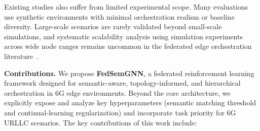 \documentclass[conference]{IEEEtran}
\begin{document}
	\textcolor{revblue}{Existing studies also suffer from limited experimental scope. Many evaluations use synthetic environments with minimal orchestration realism or baseline diversity. Large-scale scenarios are rarely validated beyond small-scale simulations, and systematic scalability analysis using simulation experiments across wide node ranges remains uncommon in the federated edge orchestration literature~\cite{yang2023rlcs, shi2023}.}
	
	\noindent\textbf{Contributions.} We propose \textbf{FedSemGNN}, a federated reinforcement learning framework designed for semantic-aware, topology-informed, and hierarchical orchestration in 6G edge environments. Beyond the core architecture, we explicitly expose and analyze key hyperparameters (semantic matching threshold and continual-learning regularization) and incorporate task priority for 6G URLLC scenarios. The key contributions of this work include:
	
\end{document}
